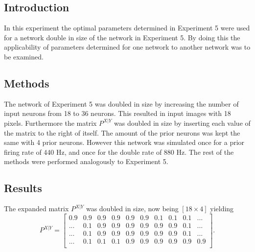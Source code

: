 \subsection{Introduction}
In this experiment the optimal parameters determined in Experiment 5 were used for a network double in size of the network in Experiment 5. By doing this the applicability of parameters determined for one network to another network was to be examined.

\subsection{Methods}
The network of Experiment 5 was doubled in size by increasing the number of input neurons from 18 to 36 neurons. This resulted in input images with 18 pixels. Furthermore the matrix $P^{X|Y}$ was doubled in size by inserting each value of the matrix to the right of itself. The amount of the prior neurons was kept the same with 4 prior neurons. However this network was simulated once for a prior firing rate of 440 Hz, and once for the double rate of 880 Hz. The rest of the methods were performed analogously to Experiment 5.

\subsection{Results}

The expanded matrix $P^{X|Y}$ was doubled in size, now being $[18 \times 4]$ yielding
\begin{equation}
\label{eqn:pXvorausgesetztYResultDoubled}
P^{X|Y} = \begin{bmatrix}
0.9 & 0.9 & 0.9 & 0.9 & 0.9 & 0.9 & 0.1 & 0.1 & 0.1 & ...\\
... & 0.1 & 0.9 & 0.9 & 0.9 & 0.9 & 0.9 & 0.9 & 0.1 & ...\\
... & 0.1 & 0.9 & 0.9 & 0.9 & 0.9 & 0.9 & 0.9 & 0.1 & ...\\
... & 0.1 & 0.1 & 0.1 & 0.9 & 0.9 & 0.9 & 0.9 & 0.9 & 0.9\\
\end{bmatrix}.
\end{equation}

